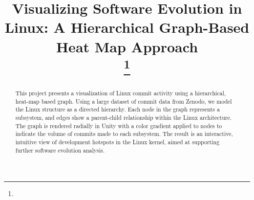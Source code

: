 \documentclass[conference]{IEEEtran}
\begin{document}
\title{Visualizing Software Evolution in Linux: A Hierarchical Graph-Based Heat Map Approach\\

\thanks{}
}

\author{
\and
{}
}



\maketitle

\begin{abstract}
This project presents a visualization of Linux commit activity using a hierarchical, heat-map based graph. Using a large dataset of commit data from Zenodo, we model the Linux structure as a directed hierarchy. Each node in the graph represents a subsystem, and edges show a parent-child relationship within the Linux architecture. The graph is rendered radially in Unity with a color gradient applied to nodes to indicate the volume of commits made to each subsystem. The result is an interactive, intuitive view of development hotspots in the Linux kernel, aimed at supporting further software evolution analysis. 
\end{abstract}
\end{document}

